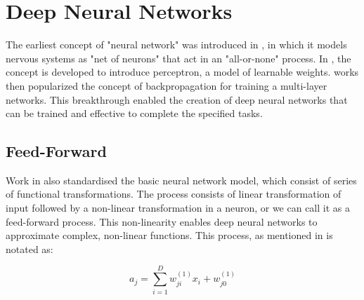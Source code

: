 \documentclass[ %
                    author={Revalda Putawara},
                supervisor={Dr. James Pope},
                    degree={MSc},
                     title={Robustness of Bayesian Neural Networks Design Choices Against Weight and Bias Perturbation Induced by Single Event Upsets (SEUs)},
                      type={},
                      year={2025}]{dissertation}
\begin{document}
\iffalse
\section{Deep Neural Networks}

%

The earliest concept of "neural network" was introduced in \cite{mcculloch43a}, in which it models nervous systems as "net of neurons" that act in an "all-or-none" process. In \cite{Rosenblatt1958ThePA}, the concept is developed to introduce perceptron, a model of learnable weights. \cite{RumelhartHintonWilliams1986} works then popularized the concept of backpropagation for training a multi-layer networks. This breakthrough enabled the creation of deep neural networks that can be trained and effective to complete the specified tasks.

\subsection{Feed-Forward} \label{subsection:feedforward}

Work in \cite{RumelhartHintonWilliams1986} also standardised the basic neural network model, which consist of series of functional transformations. The process consists of linear transformation of input followed by a non-linear transformation in a neuron, or we can call it as a feed-forward process. This non-linearity enables deep neural networks to approximate complex, non-linear functions. This process, as mentioned in \cite{bishoppatternrecognition2007} is notated as:

\begin{equation}
a_j = \sum_{i=1}^{D} w^{(1)}_{ji} x_i + w^{(1)}_{j0}
\end{equation}
\end{document}
